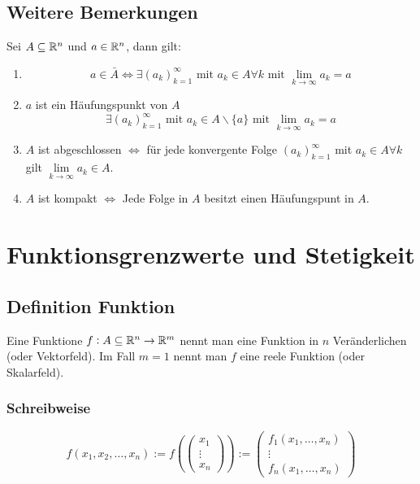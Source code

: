 \subsection{Weitere Bemerkungen}
Sei $A \subseteq  \mathbb{R}^n$ und $a \in \mathbb{R}^n$, dann gilt:
\begin{enumerate}[label= (\alph*)]
    \item
        \begin{equation*}
            a \in \bar{A} \Leftrightarrow \exists {(a_k)}_{k=1}^\infty
            \text{ mit } a_k \in A \forall k \text{ mit } \lim_{k \rightarrow \infty}
            a_k = a
        \end{equation*}
    \item $a$ ist ein Häufungspunkt von $A$
        \begin{equation*}
            \exists {(a_k)}_{k=1}^\infty \text{ mit } a_k \in A \backslash \{a\}
            \text{ mit } \lim_{k \rightarrow \infty} a_k = a
        \end{equation*}
    \item $A$ ist abgeschlossen $\Leftrightarrow$ für jede konvergente Folge
        ${(a_k)}_{k=1}^\infty$ mit $a_k \in A \forall k$ gilt
        $\lim\limits_{k \rightarrow \infty} a_k \in A$.
    \item $A$ ist kompakt $\Leftrightarrow$ Jede Folge in $A$ besitzt einen
        Häufungspunt in $A$.
\end{enumerate}

\section{Funktionsgrenzwerte und Stetigkeit}

\subsection{Definition Funktion}
Eine Funktione $f: A \subseteq \mathbb{R}^n \rightarrow \mathbb{R}^m$ nennt man eine Funktion in
$n$ Veränderlichen (oder Vektorfeld).
Im Fall $m=1$ nennt man $f$ eine reele Funktion (oder Skalarfeld).

\subsubsection{Schreibweise}
\begin{equation*}
    f(x_1, x_2, \ldots, x_n) :=
    f\left(\begin{pmatrix}
        x_1\\
        \vdots \\
        x_n
    \end{pmatrix} \right) :=
    \begin{pmatrix}
        f_1(x_1, \ldots, x_n)\\
        \vdots \\
        f_n(x_1, \ldots, x_n)
    \end{pmatrix}
\end{equation*}

